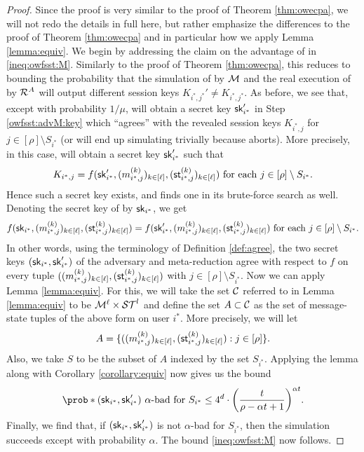 \begin{proof}
  Since the proof is very similar to the proof of Theorem \ref{thm:owecpa},
  we will not redo the details in full here,
  but rather emphasize the differences to the proof of Theorem \ref{thm:owecpa}
  and in particular how we apply Lemma \ref{lemma:equiv}.
  We begin by addressing the claim on the advantage of \redM in \eqref{ineq:owfsst:M}.
  Similarly to the proof of Theorem \ref{thm:owecpa},
  this reduces to bounding the probability that the simulation of \advA by \(\mathcal{M}\)
  and the real execution of \advA by \(\redR^{A}\) will output different session keys
  \(K_{i^{*},j^{*}}' \ne K_{i^{*},j^{*}}\).
  As before, we see that, except with probability \(1/\mu\),
  \redM will obtain a secret key \(\mathsf{sk}_{i^{*}}'\) in Step \ref{owfsst:advM:key}
  which ``agrees'' with the revealed session keys \(K_{i^{*},j}\) for \(j \in [\rho] \setminus S_{i^{*}}\)
  (or \redM will end up simulating \advA trivially because \advA aborts).
  More precisely, in this case, \redM will obtain a secret key \(\mathsf{sk}_{i^{*}}'\) such that
  \[
    K_{i^{*},j} = f(\mathsf{sk}_{i^{*}}',(m_{i^{*},j}^{(k)})_{k \in [\ell]},(\mathsf{st}_{i^{*},j}^{(k)})_{k \in [\ell]})
    \text{ for each } j \in [\rho] \setminus S_{i^{*}}.
  \]
  Hence such a secret key exists, and \advA finds one in its brute-force search as well.
  Denoting the secret key of \advA by \(\mathsf{sk}_{i^{*}}\), we get
  \[
    f(\mathsf{sk}_{i^{*}},(m_{i^{*},j}^{(k)})_{k \in [\ell]},(\mathsf{st}_{i^{*},j}^{(k)})_{k \in [\ell]})
    = f(\mathsf{sk}_{i^{*}}',(m_{i^{*},j}^{(k)})_{k \in [\ell]},(\mathsf{st}_{i^{*},j}^{(k)})_{k \in [\ell]})
    \text{ for each } j \in [\rho] \setminus S_{i^{*}}.
  \]
  In other words, using the terminology of Definition \ref{def:agree},
  the two secret keys \((\mathsf{sk}_{i^{*}},\mathsf{sk}_{i^{*}}')\) of the adversary \advA and meta-reduction \redM
  agree with respect to \(f\) on every tuple
  \(((m_{i^{*},j}^{(k)})_{k \in [\ell]},(\mathsf{st}_{i^{*},j}^{(k)})_{k \in [\ell]})\) with \(j \in [\rho] \setminus S_{i^{*}}\).
  Now we can apply Lemma \ref{lemma:equiv}.
  For this, we will take the set \(\mathcal{C}\) referred to in Lemma \ref{lemma:equiv}
  to be \(\mathcal{M}^{\ell} \times \mathcal{ST}^{l}\)
  and define the set \(A \subset \mathcal{C}\) as the set of message-state tuples of the above form on user \(i^{*}\).
  More precisely, we will let
  \[
    A =
    \{
    ((m_{i^{*},j}^{(k)})_{k \in [\ell]},(\mathsf{st}_{i^{*},j}^{(k)})_{k \in [\ell]}) : j \in [\rho]
    \}.
  \]
  Also, we take \(S\) to be the subset of \(A\) indexed by the set \(S_{i^{*}}\).
  Applying the lemma along with Corollary \ref{corollary:equiv} now gives us the bound
  \[
    \prob*{(\sk_{i^{*}},\sk_{i^{*}}') \text{ \(\alpha\)-bad for } S_{i^{*}}}
    \le 4^{d} \cdot \left( \frac{t}{\rho - \alpha t + 1} \right)^{\alpha t}.
  \]
  Finally, we find that, if \((\mathsf{sk}_{i^{*}},\mathsf{sk}_{i^{*}}')\) is not \(\alpha\)-bad for \(S_{i^{*}}\),
  then the simulation succeeds except with probability \(\alpha\).
  The bound \eqref{ineq:owfsst:M} now follows.


\end{proof}
